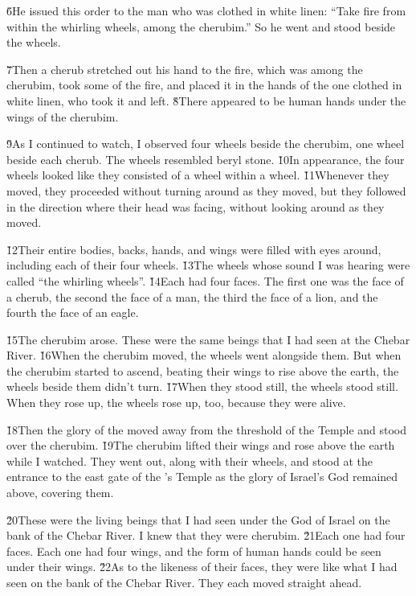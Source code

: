 \v{6}He issued this order to the man who was clothed in white linen: ``Take fire from within the whirling wheels, among the cherubim.'' So he went and stood beside the wheels.

\v{7}Then a cherub stretched out his hand to the fire, which was among the cherubim, took some of the fire, and placed it in the hands of the one clothed in white linen, who took it and left. \v{8}There appeared to be human hands under the wings of the cherubim.

\v{9}As I continued to watch, I observed four wheels beside the cherubim, one wheel beside each cherub. The wheels resembled beryl stone. \v{10}In appearance, the four wheels looked like they consisted of a wheel within a wheel. \v{11}Whenever they moved, they proceeded without turning around as they moved, but they followed in the direction where their head was facing, without looking around as they moved.

\v{12}Their entire bodies, backs, hands, and wings were filled with eyes around, including each of their four wheels. \v{13}The wheels whose sound I was hearing were called ``the whirling wheels''. \v{14}Each had four faces. The first one was the face of a cherub, the second the face of a man, the third the face of a lion, and the fourth the face of an eagle.

\v{15}The cherubim arose. These were the same beings that I had seen at the Chebar River. \v{16}When the cherubim moved, the wheels went alongside them. But when the cherubim started to ascend, beating their wings to rise above the earth, the wheels beside them didn't turn. \v{17}When they stood still, the wheels stood still. When they rose up, the wheels rose up, too, because they were alive.

\v{18}Then the glory of the  moved away from the threshold of the Temple and stood over the cherubim. \v{19}The cherubim lifted their wings and rose above the earth while I watched. They went out, along with their wheels, and stood at the entrance to the east gate of the 's Temple as the glory of Israel's God remained above, covering them.

\v{20}These were the living beings that I had seen under the God of Israel on the bank of the Chebar River. I knew that they were cherubim. \v{21}Each one had four faces. Each one had four wings, and the form of human hands could be seen under their wings. \v{22}As to the likeness of their faces, they were like what I had seen on the bank of the Chebar River. They each moved straight ahead.

